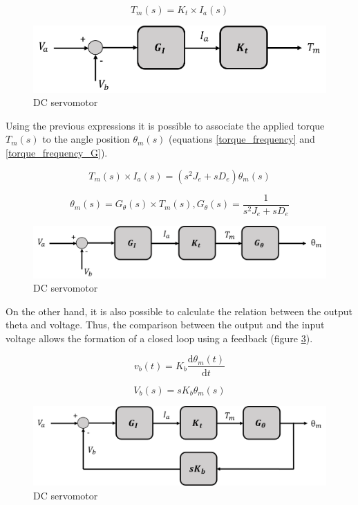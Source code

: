 \begin{equation}\label{torque_curr2}
T_{m}(s)= K_{t}\times I_{a}(s)
\end{equation}

\begin{figure}[H]
\centering
\includegraphics[scale=0.6]{figures/model2.png}
\caption{DC servomotor}
\label{model2}
\end{figure}

Using the previous expressions it is possible to associate the applied torque $T_{m}(s)$ to the angle position $\theta_{m}(s)$ (equations \ref{torque_frequency} and \ref{torque_frequency_G}).

\begin{equation}\label{torque_frequency}
T_{m}(s)\times I_{a}(s)= (s^{2}J_{e} + sD_{e})\theta_{m}(s)
\end{equation}

\begin{equation}\label{torque_frequency_G}
\theta_{m}(s)= G_{\theta}(s)\times T_{m}(s) , G_{\theta}(s)=\frac{1}{s^{2}J_{e} + sD_{e}}
\end{equation}

\begin{figure}[H]
\centering
\includegraphics[scale=0.6]{figures/model3.png}
\caption{DC servomotor}
\label{model3}
\end{figure}

On the other hand, it is also possible to calculate the relation between the output theta and voltage. Thus, the comparison between the output and the input voltage allows the formation of a closed loop using a feedback (figure \ref{model4}).

\begin{equation}\label{feedback1}
v_{b}(t)= K_{b}\frac{\mathrm{d} \theta_{m}(t)}{\mathrm{d} t}
\end{equation}

\begin{equation}\label{feedback2}
V_{b}(s)= sK_{b}\theta_{m}(s)
\end{equation}

\begin{figure}[H]
\centering
\includegraphics[scale=0.6]{figures/model4.png}
\caption{DC servomotor}
\label{model4}
\end{figure}


